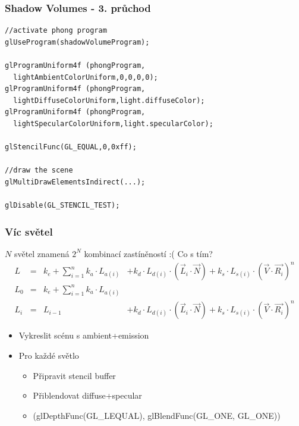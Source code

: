 \begin{frame}[fragile]
  \frametitle{Shadow Volumes - 3. průchod}

  \begin{verbatim}
//activate phong program
glUseProgram(shadowVolumeProgram);

glProgramUniform4f (phongProgram,
  lightAmbientColorUniform,0,0,0,0);
glProgramUniform4f (phongProgram,
  lightDiffuseColorUniform,light.diffuseColor);
glProgramUniform4f (phongProgram,
  lightSpecularColorUniform,light.specularColor);

glStencilFunc(GL_EQUAL,0,0xff);

//draw the scene
glMultiDrawElementsIndirect(...);

glDisable(GL_STENCIL_TEST);
  \end{verbatim}
\end{frame}


\begin{frame}
    \frametitle{Víc světel}
    $N$ světel znamená $2^N$ kombinací zastíněností :( Co s tím?
    \pause\vfill
    \begin{equation*}
        \begin{array}{lcll}
            L &=& k_e + \sum\limits_{i=1}^n k_a \cdot L_{a(i)}   & + k_d \cdot L_{d(i)} \cdot (\vec L_i \cdot \vec N) + k_s \cdot L_{s(i)} \cdot (\vec V \cdot \vec{R_i})^n \\
            L_0 &=& k_e + \sum\limits_{i=1}^n k_a \cdot L_{a(i)} & \\
            L_i &=& L_{i-1}                                      & + k_d \cdot L_{d(i)} \cdot (\vec L_i \cdot \vec N) + k_s \cdot L_{s(i)} \cdot (\vec V \cdot \vec{R_i})^n
        \end{array}
    \end{equation*}
    \pause\vfill
    \begin{itemize}
        \item Vykreslit scénu s ambient+emission
        \item Pro každé světlo
        \begin{itemize}
            \item Připravit stencil buffer
            \item Přiblendovat diffuse+specular
            \item (glDepthFunc(GL\_LEQUAL), glBlendFunc(GL\_ONE, GL\_ONE))
        \end{itemize}
    \end{itemize}
\end{frame}


